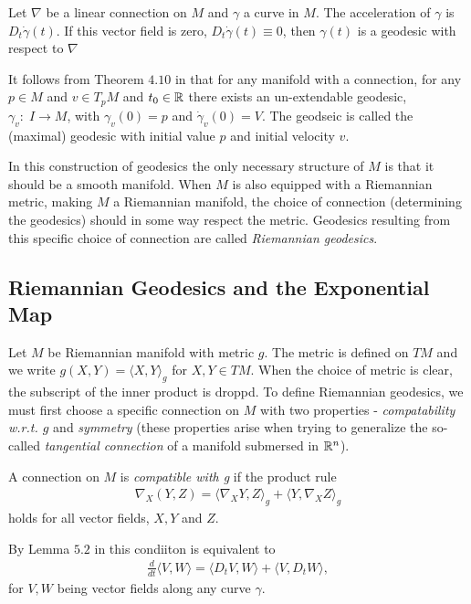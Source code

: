 \begin{definition}
Let $\nabla$ be a linear connection on $M$ and $\gamma$ a curve in $M$. The acceleration of $\gamma$ is $D_t \dot{\gamma}(t)$. If this vector field is zero, $D_t \dot{\gamma}(t) \equiv 0$, then $\gamma(t)$ is a geodesic with respect to $\nabla$
\end{definition}

It follows from Theorem $4.10$ in \cite{lee2006riemannian} that for any manifold with a connection, for any $p \in M$ and $v \in T_pM$ and $t_0 \in \mathbb{R}$ there exists an un-extendable geodesic, $\gamma_v: \; I \rightarrow M$, with $\gamma_v(0) = p$ and $\dot{\gamma}_v(0) = V$. The geodseic is called the (maximal) geodesic with initial value $p$ and initial velocity $v$.

In this construction of geodesics the only necessary structure of $M$ is that it should be a smooth manifold. When $M$ is also equipped with a Riemannian metric, making $M$ a Riemannian manifold, the choice of connection (determining the geodesics) should in some way respect the metric. Geodesics resulting from this specific choice of connection are called \textit{Riemannian geodesics}.

\subsection{Riemannian Geodesics and the Exponential Map}

Let $M$ be Riemannian manifold with metric $g$. The metric is defined on $TM$ and we write $g(X,Y) = \langle X, Y \rangle_g$ for $X, Y \in TM$. When the choice of metric is clear, the subscript of the inner product is droppd. To define Riemannian geodesics, we must first choose a specific connection on $M$ with two properties - \textit{compatability w.r.t. $g$} and \textit{symmetry} (these properties arise when trying to generalize the so-called \textit{tangential connection} of a manifold submersed in $\mathbb{R}^n$).

\begin{definition}
A connection on $M$ is \textit{compatible with g} if the product rule
\begin{align*}
\nabla_X (Y, Z) = \langle \nabla_X Y, Z \rangle_g + \langle Y, \nabla_X Z \rangle_g
\end{align*}
holds for all vector fields, $X, Y$ and $Z$.
\end{definition}

By Lemma $5.2$ in \cite{lee2006riemannian} this condiiton is equivalent to
\begin{align*}
\frac{d}{dt} \langle V, W \rangle = \langle D_t V, W \rangle + \langle V, D_t W \rangle,
\end{align*} 
for $V, W$ being vector fields along any curve $\gamma$.

